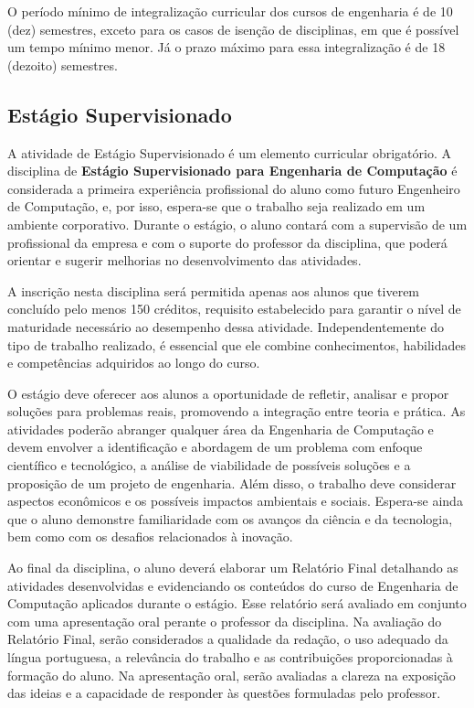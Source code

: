 O período mínimo de integralização curricular dos cursos de engenharia é de 10 (dez) semestres, exceto para os casos de isenção de disciplinas, em que é possível um tempo mínimo menor. Já o prazo máximo para essa integralização é de 18 (dezoito) semestres.


\subsection{Estágio Supervisionado}

A atividade de Estágio Supervisionado é um elemento curricular obrigatório.
A disciplina de \textbf{Estágio Supervisionado para Engenharia de Computação} é considerada a primeira experiência profissional do aluno como futuro Engenheiro de Computação, e, por isso, espera-se que o trabalho seja realizado em um ambiente corporativo. Durante o estágio, o aluno contará com a supervisão de um profissional da empresa e com o suporte do professor da disciplina, que poderá orientar e sugerir melhorias no desenvolvimento das atividades.

A inscrição nesta disciplina será permitida apenas aos alunos que tiverem concluído pelo menos 150 créditos, requisito estabelecido para garantir o nível de maturidade necessário ao desempenho dessa atividade. Independentemente do tipo de trabalho realizado, é essencial que ele combine conhecimentos, habilidades e competências adquiridos ao longo do curso.

O estágio deve oferecer aos alunos a oportunidade de refletir, analisar e propor soluções para problemas reais, promovendo a integração entre teoria e prática. As atividades poderão abranger qualquer área da Engenharia de Computação e devem envolver a identificação e abordagem de um problema com enfoque científico e tecnológico, a análise de viabilidade de possíveis soluções e a proposição de um projeto de engenharia. Além disso, o trabalho deve considerar aspectos econômicos e os possíveis impactos ambientais e sociais. Espera-se ainda que o aluno demonstre familiaridade com os avanços da ciência e da tecnologia, bem como com os desafios relacionados à inovação.

Ao final da disciplina, o aluno deverá elaborar um Relatório Final detalhando as atividades desenvolvidas e evidenciando os conteúdos do curso de Engenharia de Computação aplicados durante o estágio. Esse relatório será avaliado em conjunto com uma apresentação oral perante o professor da disciplina. Na avaliação do Relatório Final, serão considerados a qualidade da redação, o uso adequado da língua portuguesa, a relevância do trabalho e as contribuições proporcionadas à formação do aluno. Na apresentação oral, serão avaliadas a clareza na exposição das ideias e a capacidade de responder às questões formuladas pelo professor.

